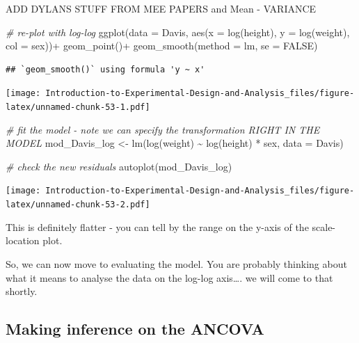 \documentclass[
]{book}
\newenvironment{Shaded}{\begin{snugshade}}{\end{snugshade}}
\newcommand{\AttributeTok}[1]{\textcolor[rgb]{0.77,0.63,0.00}{#1}}
\newcommand{\CommentTok}[1]{\textcolor[rgb]{0.56,0.35,0.01}{\textit{#1}}}
\newcommand{\ConstantTok}[1]{\textcolor[rgb]{0.00,0.00,0.00}{#1}}
\newcommand{\FunctionTok}[1]{\textcolor[rgb]{0.00,0.00,0.00}{#1}}
\newcommand{\NormalTok}[1]{#1}
\newcommand{\OtherTok}[1]{\textcolor[rgb]{0.56,0.35,0.01}{#1}}
\newcommand{\SpecialCharTok}[1]{\textcolor[rgb]{0.00,0.00,0.00}{#1}}
\begin{document}
ADD DYLANS STUFF FROM MEE PAPERS and Mean - VARIANCE

\begin{Shaded}
\begin{Highlighting}[]
\CommentTok{\# re{-}plot with log{-}log}
\FunctionTok{ggplot}\NormalTok{(}\AttributeTok{data =}\NormalTok{ Davis, }\FunctionTok{aes}\NormalTok{(}\AttributeTok{x =} \FunctionTok{log}\NormalTok{(height), }\AttributeTok{y =} \FunctionTok{log}\NormalTok{(weight), }\AttributeTok{col =}\NormalTok{ sex))}\SpecialCharTok{+}
  \FunctionTok{geom\_point}\NormalTok{()}\SpecialCharTok{+}
  \FunctionTok{geom\_smooth}\NormalTok{(}\AttributeTok{method =}\NormalTok{ lm, }\AttributeTok{se =} \ConstantTok{FALSE}\NormalTok{)}
\end{Highlighting}
\end{Shaded}

\begin{verbatim}
## `geom_smooth()` using formula 'y ~ x'
\end{verbatim}

\texttt{[image: Introduction-to-Experimental-Design-and-Analysis\_files/figure-latex/unnamed-chunk-53-1.pdf]}

\begin{Shaded}
\begin{Highlighting}[]
\CommentTok{\# fit the model {-} note we can specify the transformation RIGHT IN THE MODEL}
\NormalTok{mod\_Davis\_log }\OtherTok{\textless{}{-}} \FunctionTok{lm}\NormalTok{(}\FunctionTok{log}\NormalTok{(weight) }\SpecialCharTok{\textasciitilde{}} \FunctionTok{log}\NormalTok{(height) }\SpecialCharTok{*}\NormalTok{ sex, }\AttributeTok{data =}\NormalTok{ Davis)}

\CommentTok{\# check the new residuals}
\FunctionTok{autoplot}\NormalTok{(mod\_Davis\_log)}
\end{Highlighting}
\end{Shaded}

\texttt{[image: Introduction-to-Experimental-Design-and-Analysis\_files/figure-latex/unnamed-chunk-53-2.pdf]}

This is definitely flatter - you can tell by the range on the y-axis of the scale-location plot.

So, we can now move to evaluating the model. You are probably thinking about what it means to analyse the data on the log-log axis\ldots. we will come to that shortly.

\hypertarget{making-inference-on-the-ancova}{%
\subsection{Making inference on the ANCOVA}\label{making-inference-on-the-ancova}}
\end{document}
